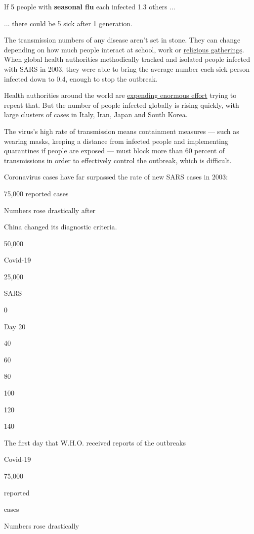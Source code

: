 If 5 people with \textbf{seasonal flu} each infected 1.3 others ...

... there could be 5 sick after 1 generation.

The transmission numbers of any disease aren't set in stone. They can
change depending on how much people interact at school, work or
\href{https://www.nytimes3xbfgragh.onion/2020/02/21/world/asia/south-korea-coronavirus-shincheonji.html}{religious
gatherings}. When global health authorities methodically tracked and
isolated people infected with SARS in 2003, they were able to bring the
average number each sick person infected down to 0.4, enough to stop the
outbreak.

Health authorities around the world are
\href{https://www.nytimes3xbfgragh.onion/2020/01/29/health/china-coronavirus-outbreak.html}{expending
enormous effort} trying to repeat that. But the number of people
infected globally is rising quickly, with large clusters of cases in
Italy, Iran, Japan and South Korea.

The virus's high rate of transmission means containment measures ---
such as wearing masks, keeping a distance from infected people and
implementing quarantines if people are exposed --- must block more than
60 percent of transmissions in order to effectively control the
outbreak, which is difficult.

Coronavirus cases have far surpassed the rate of new SARS cases in 2003:

75,000 reported cases

Numbers rose drastically after

China changed its diagnostic criteria.

50,000

Covid-19

25,000

SARS

0

Day 20

40

60

80

100

120

140

The first day that W.H.O. received reports of the outbreaks

Covid-19

75,000

reported

cases

Numbers rose drastically

